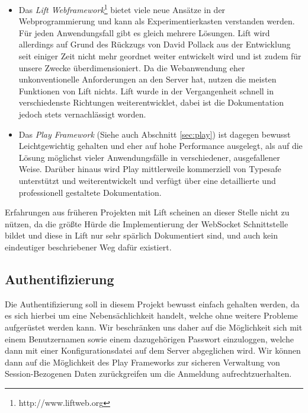 \begin{itemize}

  \item Das \textit{Lift Webframework}\footnote{http://www.liftweb.org} bietet viele neue Ansätze in
der Webprogrammierung und kann als Experimentierkasten verstanden werden. Für jeden Anwendungsfall
gibt es gleich mehrere Lösungen. Lift wird allerdings auf Grund des Rückzugs von David Pollack aus
der Entwicklung seit einiger Zeit nicht mehr geordnet weiter entwickelt wird und ist zudem für
unsere Zwecke überdimensioniert. Da die Webanwendung eher unkonventionelle Anforderungen an den
Server hat, nutzen die meisten Funktionen von Lift nichts. Lift wurde in der Vergangenheit schnell
in verschiedenste Richtungen weiterentwicklet, dabei ist die Dokumentation jedoch stets
vernachlässigt worden.


  \item Das \textit{Play Framework} (Siehe auch Abschnitt \ref{sec:play}) ist dagegen bewusst
Leichtgewichtig gehalten und eher auf hohe Performance ausgelegt, als auf die Lösung möglichst
vieler Anwendungsfälle in verschiedener, ausgefallener Weise. Darüber hinaus wird Play mittlerweile
kommerziell von Typesafe unterstützt und weiterentwickelt und verfügt über eine detaillierte und
professionell gestaltete Dokumentation. \cite{play}

\end{itemize}

Erfahrungen aus früheren Projekten mit Lift scheinen an dieser Stelle nicht zu nützen, da die größte
Hürde die Implementierung der WebSocket Schnittstelle bildet und diese in Lift nur sehr spärlich
Dokumentiert sind, und auch kein eindeutiger beschriebener Weg dafür existiert.

\subsection{Authentifizierung}

Die Authentifizierung soll in diesem Projekt bewusst einfach gehalten werden, da es sich hierbei um
eine Nebensächlichkeit handelt, welche ohne weitere Probleme aufgerüstet werden kann. Wir
beschränken uns daher auf die Möglichkeit sich mit einem Benutzernamen sowie einem dazugehörigen
Passwort einzuloggen, welche dann mit einer Konfigurationsdatei auf dem Server abgeglichen wird. Wir
können dann auf die Möglichkeit des Play Frameworks zur sicheren Verwaltung von Session-Bezogenen
Daten zurückgreifen um die Anmeldung aufrechtzuerhalten.

